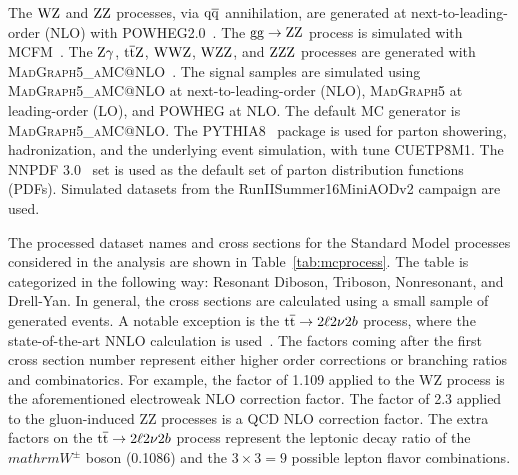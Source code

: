 The $\mathrm{W}\mathrm{Z}$ and $\mathrm{Z}\mathrm{Z}$ processes, via $\mathrm{q}\mathrm{\overline{q}}$ annihilation, 
are generated at next-to-leading-order (NLO) with 
\textsc{POWHEG2.0}~\cite{Alioli:2008gx,Nason:2004rx,Frixione:2007vw,powheg:2010}. 
The $\mathrm{g}\mathrm{g} \to \mathrm{Z}\mathrm{Z}$ process is simulated with MCFM~\cite{MCFM}. 
The $\mathrm{Z}\gamma$, ${\mathrm{t}\overline{\mathrm{t}}} \mathrm{Z}$, $\mathrm{W}\mathrm{W}\mathrm{Z}$, $\mathrm{W}\mathrm{Z}\mathrm{Z}$, and $\mathrm{Z}\mathrm{Z}\mathrm{Z}$ 
processes are generated with \textsc{MadGraph5\_aMC@NLO}~\cite{Alwall:2014hca}.
The signal samples are simulated using \textsc{MadGraph5\_aMC@NLO} at next-to-leading-order (NLO), 
\textsc{MadGraph5} at leading-order (LO), and \textsc{POWHEG} at NLO. The 
default MC generator is \textsc{MadGraph5\_aMC@NLO}. 
The \textsc{PYTHIA8}~\cite{Sjostrand:2006za,Sjostrand:2015} package is used 
for parton showering, hadronization, and the underlying event simulation,
with tune CUETP8M1.
The NNPDF 3.0~\cite{nnpdf} set is used as the default set of parton distribution 
functions (PDFs). 
Simulated datasets from the RunIISummer16MiniAODv2 campaign are used.

The processed dataset names and cross sections for the Standard Model processes considered 
in the analysis are shown in Table~\ref{tab:mcprocess}.
The table is categorized in the following way: Resonant Diboson, Triboson, Nonresonant, and Drell-Yan.
In general, the cross sections are calculated using a small sample of generated events.
A notable exception is the ${\mathrm{t}\overline{\mathrm{t}}} \to 2\ell 2\nu 2b$ process, where the state-of-the-art NNLO calculation is used~\cite{Czakon:2013goa}.
The factors coming after the first cross section number represent either higher order corrections or branching ratios and combinatorics.
For example, the factor of 1.109 applied to the WZ process is the aforementioned electroweak NLO correction factor.
The factor of 2.3 applied to the gluon-induced ZZ processes is a QCD NLO correction factor.
The extra factors on the ${\mathrm{t}\overline{\mathrm{t}}} \to 2\ell 2\nu 2b$ process represent the
leptonic decay ratio of the $mathrm{W^\pm}$ boson (0.1086) and the $3\times3=9$ possible lepton flavor combinations.

